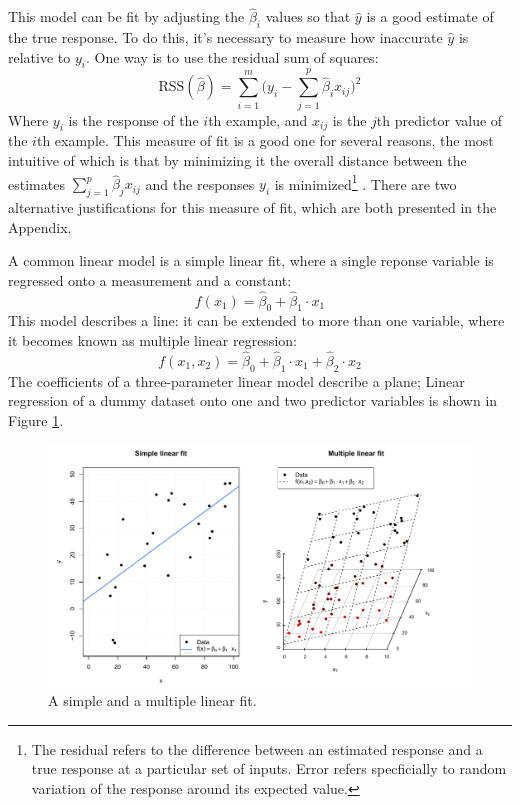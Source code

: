 \documentclass[11pt,a4paper,article]{memoir} %
\begin{document}
This model can be fit by adjusting the $\hat{\beta}_i$ values so that $\hat{y}$ is a good estimate of the true response. To do this, it's necessary to measure how inaccurate $\hat{y}$ is relative to $y_i$. One way is to use the residual sum of squares:
\begin{equation}
	\text{RSS}(\hat{\beta}) = \sum_{i = 1}^m \Big(y_i - \sum_{j = 1}^p \hat{\beta}_i x_{ij})^2
	\label{eq:rss}
\end{equation}
Where $y_i$ is the response of the $i$th example, and $x_{ij}$ is the $j$th predictor value of the $i$th example. This measure of fit is a good one for several reasons, the most intuitive of which is that by minimizing it the overall distance between the estimates $\sum_{j = 1}^p \hat{\beta}_j x_{ij}$ and the responses $y_i$ is minimized\footnote{The residual refers to the difference between an estimated response and a true response at a particular set of inputs. Error refers specficially to random variation of the response around its expected value.} . There are two alternative justifications for this measure of fit, which are both presented in the Appendix.

 A common linear model is a simple linear fit, where a single reponse variable is regressed onto a measurement and a constant:
\begin{equation}
	f(x_1) = \hat{\beta}_0 + \hat{\beta}_1 \cdot x_1
\end{equation}
This model describes a line: it can be extended to more than one variable, where it becomes known as multiple linear regression:
\begin{equation}
	f(x_1, x_2) = \hat{\beta}_0 + \hat{\beta}_1 \cdot x_1 + \hat{\beta}_2 \cdot x_2
\end{equation}
The coefficients of a three-parameter linear model describe a plane; Linear regression of a dummy dataset onto one and two predictor variables is shown in Figure \ref{fig:linear_regression}. 
\begin{figure}
\includegraphics[width=\textwidth]{linear_fits.pdf}
\caption{A simple and a multiple linear fit.}
\label{fig:linear_regression}
\end{figure}
\end{document}

